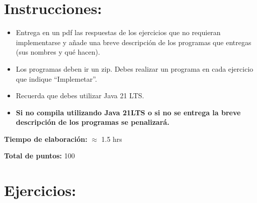 \section*{Instrucciones:}

\begin{itemize}
    \item Entrega en un pdf las respuestas de los ejercicios que no requieran implementarse y añade una breve descripción de los programas que entregas (sus nombres y qué hacen).
    
    \item Los programas deben ir un zip. Debes realizar un programa en cada ejercicio que indique “Implemetar”.

    \item Recuerda que debes utilizar Java 21 LTS.

    \item \textbf{Si no compila utilizando Java 21LTS o si no se entrega la breve descripción de los
    programas se penalizará.}
\end{itemize}

\textbf{Tiempo de elaboración:} $\approx$ 1.5 hrs

\textbf{Total de puntos:} 100

\section*{Ejercicios:}

